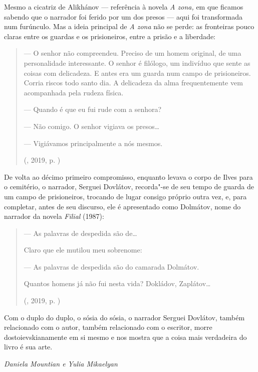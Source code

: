 Mesmo a cicatriz de Alikhánov --- referência à novela \emph{A zona,} em
que ficamos sabendo que o narrador foi ferido por um dos presos --- aqui
foi transformada num furúnculo. Mas a ideia principal de \emph{A zona}
não se perde: as fronteiras pouco claras entre os guardas e os
prisioneiros, entre a prisão e a liberdade:

\begin{quote}
\forceindent{}--- O senhor não compreendeu. Preciso de um homem original, de uma
personalidade interessante. O senhor é filólogo, um indivíduo que sente
as coisas com delicadeza. E antes era um guarda num campo de
prisioneiros. Corria riscos todo santo dia. A delicadeza da alma
frequentemente vem acompanhada pela rudeza física.

--- Quando é que eu fui rude com a senhora?

--- Não comigo. O senhor vigiava os presos\ldots{}

--- Vigiávamos principalmente a nós mesmos. 

(, 2019, p. \pageref{ref8})
\end{quote}

De volta ao décimo primeiro compromisso, enquanto levava o corpo de
Ilves para o cemitério, o narrador, Serguei Dovlátov, recorda"-se de seu
tempo de guarda de um campo de prisioneiros, trocando de lugar consigo
próprio outra vez, e, para completar, antes de seu discurso, ele é
apresentado como Dolmátov, nome do narrador da novela \emph{Filial}
(1987):

\begin{quote}
\forceindent{}--- As palavras de despedida são de\ldots{}

Claro que ele mutilou meu sobrenome:

--- As palavras de despedida são do camarada Dolmátov.

Quantos homens já não fui nesta vida? Dokládov, Zaplátov\ldots{}

(, 2019, p. \pageref{ref9})
\end{quote}

Com o duplo do duplo, o sósia do sósia, o narrador Serguei Dovlátov,
também relacionado com o autor, também relacionado com o escritor, morre
dostoievskianamente em si mesmo e nos mostra que a coisa mais verdadeira
do livro é sua arte.

\begin{flushright}
\emph{Daniela Mountian e Yulia Mikaelyan}
\end{flushright}
